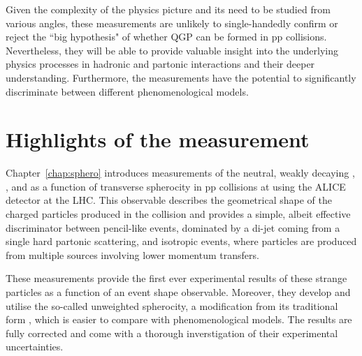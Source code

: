 Given the complexity of the physics picture and its need to be studied from various angles, these measurements are unlikely to single-handedly confirm or reject the ``big hypothesis" of whether QGP can be formed in pp collisions. Nevertheless, they will be able to provide valuable insight into the underlying physics processes in hadronic and partonic interactions and their deeper understanding. Furthermore, the measurements have the potential to significantly discriminate between different phenomenological models.

\section{Highlights of the \SOPT measurement}

Chapter~\ref{chap:sphero} introduces measurements of the neutral, weakly decaying \KOs, \LA, and \AL as a function of transverse spherocity \SOPT in pp collisions at  using the ALICE detector at the LHC. This observable describes the geometrical shape of the charged particles produced in the collision and provides a simple, albeit effective discriminator between pencil-like events, dominated by a di-jet coming from a single hard partonic scattering, and isotropic events, where particles are produced from multiple sources involving lower momentum transfers.

These measurements provide the first ever experimental results of these strange particles as a function of an event shape observable. Moreover, they develop and utilise the so-called unweighted spherocity, a modification from its traditional form \SO, which is easier to compare with phenomenological models. The results are fully corrected and come with a thorough inverstigation of their experimental uncertainties.

